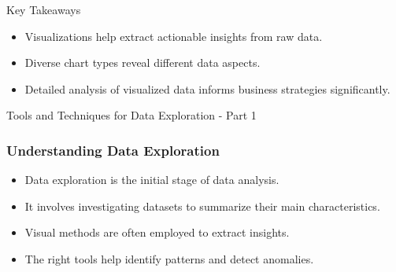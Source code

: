 \documentclass[aspectratio=169]{beamer}
\begin{document}
\begin{frame}{Key Takeaways}
  \begin{itemize}
    \item Visualizations help extract actionable insights from raw data.
    \item Diverse chart types reveal different data aspects.
    \item Detailed analysis of visualized data informs business strategies significantly.
  \end{itemize}
\end{frame}

\begin{frame}[fragile]{Tools and Techniques for Data Exploration - Part 1}
    \frametitle{Understanding Data Exploration}
    \begin{itemize}
        \item Data exploration is the initial stage of data analysis.
        \item It involves investigating datasets to summarize their main characteristics.
        \item Visual methods are often employed to extract insights.
        \item The right tools help identify patterns and detect anomalies.
    \end{itemize}
\end{frame}
\end{document}
